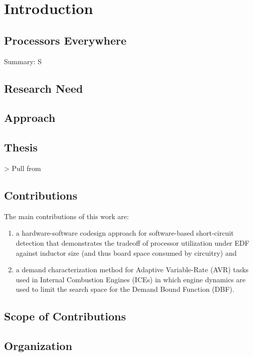 \section{Introduction}   \label{chap:introduction}

\subsection{Processors Everywhere}

Summary: S


\subsection{Research Need}

\subsection{Approach}

\subsection{Thesis}

> Pull from

\subsection{Contributions}

The main contributions of this work are:
\begin{enumerate}
    \item a hardware-software codesign approach for software-based short-circuit detection that demonstrates the tradeoff of processor utilization under EDF against inductor size (and thus board space consumed by circuitry) and
    \item a demand characterization method for Adaptive Variable-Rate (AVR) tasks used in Internal Combustion Engines (ICEs) in which engine dynamics are used to limit the search space for the Demand Bound Function (DBF).
\end{enumerate}

\subsection{Scope of Contributions}



\subsection{Organization}

